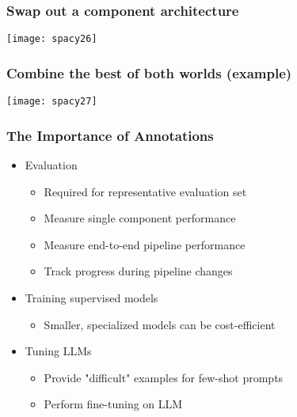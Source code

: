 \begin{frame}[fragile]\frametitle{Swap out a component architecture}

\begin{center}
\texttt{[image: spacy26]}
\end{center}


\end{frame}

\begin{frame}[fragile]\frametitle{Combine the best of both worlds (example)}

\begin{center}
\texttt{[image: spacy27]}
\end{center}


\end{frame}

\begin{frame}[fragile]\frametitle{The Importance of Annotations}

	\begin{itemize}
	\item Evaluation
	\begin{itemize}
	\item Required for representative evaluation set
	\item Measure single component performance
	\item Measure end-to-end pipeline performance
	\item Track progress during pipeline changes
	\end{itemize}
	\item Training supervised models
	\begin{itemize}
	\item Smaller, specialized models can be cost-efficient
	\end{itemize}
	\item Tuning LLMs
	\begin{itemize}
	\item Provide "difficult" examples for few-shot prompts
	\item Perform fine-tuning on LLM
	\end{itemize}
	\end{itemize}

\end{frame}

